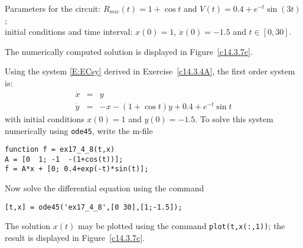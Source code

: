 \documentclass{ximera}
\begin{document}
\begin{exercise} \label{c14.3.7c}
Parameters for the circuit: $R_{mic}(t) = 1+\cos t$ and $V(t) = 0.4+e^{-t}\sin(3t)$;\\
initial conditions and time interval: $x(0) = 1$, $\dot{x}(0) = -1.5$ and 
$t\in[0,30]$.

\begin{solution}
\ans The numerically computed solution is displayed in 
Figure~\ref{c14.3.7c}.

\soln  Using the system \eqref{E:ECsy} derived in 
Exercise~\ref{c14.3.4A}, the first order system is:
\begin{eqnarray*}
\dot{x} & = & y \\
\dot{y} & = & -x - (1+\cos t)y + 0.4 + e^{-t}\sin t
\end{eqnarray*}
with initial conditions $x(0)=1$ and $y(0)=-1.5$. To solve this system numerically 
using {\tt ode45}, write the m-file
\begin{verbatim}
function f = ex17_4_8(t,x)
A = [0  1; -1  -(1+cos(t))];
f = A*x + [0; 0.4+exp(-t)*sin(t)];
\end{verbatim}
Now solve the differential equation using the command
\begin{verbatim}
[t,x] = ode45('ex17_4_8',[0 30],[1;-1.5]);
\end{verbatim}
The solution $x(t)$ may be plotted using the command {\tt plot(t,x(:,1))}; the 
result is displayed in Figure~\ref{c14.3.7c}.
\begin{figure}[htb]
     \centerline{%
     }
\end{figure} 



\end{solution}
\end{exercise}
\end{document}
